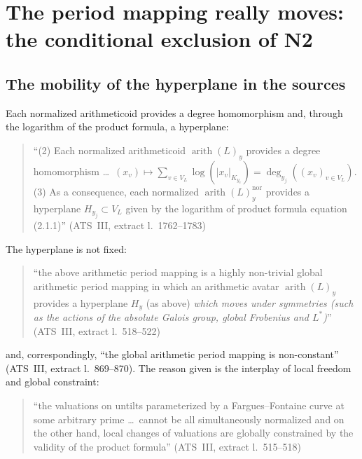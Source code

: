 \documentclass[11pt,a4paper]{article}
\theoremstyle{definition}
\theoremstyle{plain}
\theoremstyle{definition}
\newcommand{\arith}{\operatorname{arith}}
\newcommand{\anchor}[2]{(#1, extract l.~#2)}
\begin{document}
\section{The period mapping really moves: the conditional exclusion of N2}
\label{sec:D1}

\subsection{The mobility of the hyperplane in the sources}

Each normalized arithmeticoid provides a degree homomorphism and, through the
logarithm of the product formula, a hyperplane:

\begin{quote}\small
``(2) Each normalized arithmeticoid $\arith(L)_y$ provides a degree homomorphism
\ldots\ $(x_v) \mapsto \sum_{v \in V_L} \log(|x_v|_{K_{y_v}}) = \deg_{y_j}((x_v)_{v \in V_L})$.
(3) As a consequence, each normalized $\arith(L)^{\mathrm{nor}}_y$ provides a
hyperplane $H_{y_j} \subset V_L$ given by the logarithm of product formula equation
(2.1.1)'' \hfill\anchor{ATS~III}{1762--1783}
\end{quote}

The hyperplane is not fixed:

\begin{quote}\small
``the above arithmetic period mapping is a highly non-trivial global arithmetic
period mapping in which an arithmetic avatar $\arith(L)_y$ provides a hyperplane
$H_y$ (as above) \emph{which moves under symmetries (such as the actions of the
absolute Galois group, global Frobenius and $L^*$)}''
\hfill\anchor{ATS~III}{518--522}
\end{quote}

and, correspondingly, ``the global arithmetic period mapping is non-constant''
\anchor{ATS~III}{869--870}. The reason given is the interplay of local freedom and
global constraint:

\begin{quote}\small
``the valuations on untilts parameterized by a Fargues--Fontaine curve at some
arbitrary prime \ldots\ cannot be all simultaneously normalized and on the other
hand, local changes of valuations are globally constrained by the validity of the
product formula'' \hfill\anchor{ATS~III}{515--518}
\end{quote}
\end{document}
